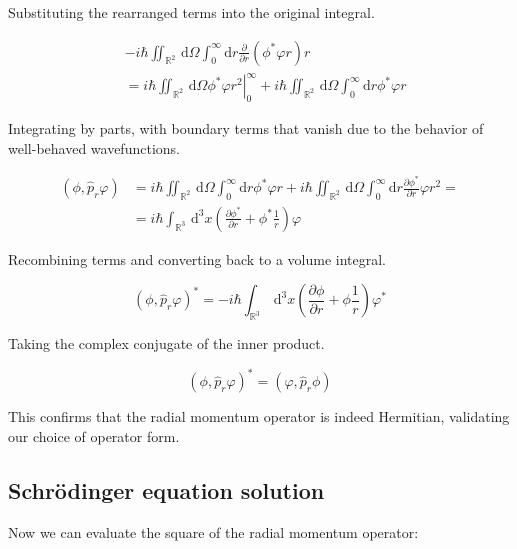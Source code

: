 \documentclass[italian]{HKNdocument}
\begin{document}
Substituting the rearranged terms into the original integral.

\begin{align}
& -i \hbar \iint_{\mathbb{R}^{2}} \, \mathrm{d} \Omega \int_{0}^{\infty} \mathrm{d} r \frac{\partial}{\partial r}\left(\phi^{*} \varphi r\right) r \\
& =\left.i \hbar \iint_{\mathbb{R}^{2}} \, \mathrm{d} \Omega \phi^{*} \varphi r^{2}\right|_{0} ^{\infty}+i \hbar \iint_{\mathbb{R}^{2}} \, \mathrm{d} \Omega \int_{0}^{\infty} \mathrm{d} r \phi^{*} \varphi r
\end{align}

Integrating by parts, with boundary terms that vanish due to the behavior of well-behaved wavefunctions.

\begin{align}
\left(\phi, \hat{p}_{r} \varphi\right) & =i \hbar \iint_{\mathbb{R}^{2}} \, \mathrm{d} \Omega \int_{0}^{\infty} \mathrm{d} r \phi^{*} \varphi r+i \hbar \iint_{\mathbb{R}^{2}} \, \mathrm{d} \Omega \int_{0}^{\infty} \mathrm{d} r \frac{\partial \phi^{*}}{\partial r} \varphi r^{2}=  \\
& =i \hbar \int_{\mathbb{R}^{3}} \, \mathrm{d}^{3} x\left(\frac{\partial \phi^{*}}{\partial r}+\phi^{*} \frac{1}{r}\right) \varphi
\end{align}

Recombining terms and converting back to a volume integral.

\begin{equation}
\left(\phi, \hat{p}_{r} \varphi\right)^{*}=-i \hbar \int_{\mathbb{R}^{3}} \, \mathrm{d}^{3} x\left(\frac{\partial \phi}{\partial r}+\phi \frac{1}{r}\right) \varphi^{*}
\end{equation}

Taking the complex conjugate of the inner product.

\begin{equation}
\left(\phi, \hat{p}_{r} \varphi\right)^{*}=\left(\varphi, \hat{p}_{r} \phi\right)
\end{equation}

This confirms that the radial momentum operator is indeed Hermitian, validating our choice of operator form.

\subsection{Schrödinger equation solution}
Now we can evaluate the square of the radial momentum operator:
\end{document}
